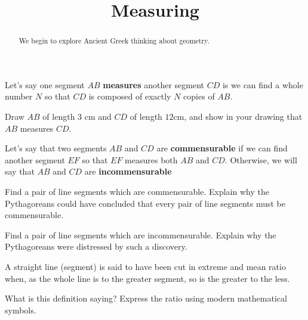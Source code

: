 \documentclass[nooutcomes]{ximera}
\title{Measuring}
\begin{document}
\begin{abstract}
    We begin to explore Ancient Greek thinking about geometry.
\end{abstract}
\maketitle

\begin{definition}
Let's say one segment $AB$ {\bf measures} another segment $CD$ is we can find a whole number $N$ so that $CD$ is composed of exactly $N$ copies of $AB$.
\end{definition}

\begin{problem}
Draw $AB$ of length $3$ cm and $CD$ of length $12$cm, and show in your drawing that $AB$ measures $CD$.
\end{problem}

\begin{definition}
Let's say that two segments $AB$ and $CD$ are {\bf commensurable} if we can find another segment $EF$ so that $EF$ measures both $AB$ and $CD$. Otherwise, we will say that $AB$ and $CD$ are {\bf incommensurable}
\end{definition}


\begin{problem}
Find a pair of line segments which are commensurable. Explain why the Pythagoreans could have concluded that every pair of line segments must be commensurable.
\end{problem}

\begin{problem}
Find a pair of line segments which are incommensurable. Explain why the Pythagoreans were distressed by such a discovery.
\end{problem}

\begin{definition}
A straight line (segment) is said to have been cut in extreme and mean ratio when, as the whole line is to the greater segment, so is the greater to the less.
\end{definition}

\begin{problem}
What is this definition saying? Express the ratio using modern mathematical symbols.
\begin{center}
\end{center}
\end{problem}
\end{document}
